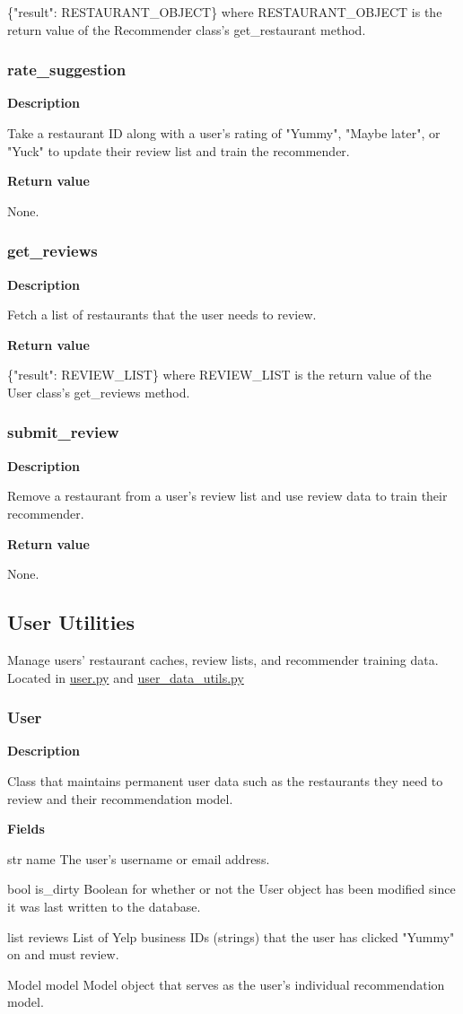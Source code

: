 \documentclass[11pt]{article}
\begin{document}
\{"result": RESTAURANT\_OBJECT\} where RESTAURANT\_OBJECT is the return value of the Recommender class's get\_restaurant method.

\subsubsection{rate\_suggestion}
\textbf{Description}

Take a restaurant ID along with a user's rating of "Yummy", "Maybe later", or "Yuck" to update their review list and train the recommender.

\textbf{Return value}

None.

\subsubsection{get\_reviews}
\textbf{Description}

Fetch a list of restaurants that the user needs to review.

\textbf{Return value}

\{"result": REVIEW\_LIST\} where REVIEW\_LIST is the return value of the User class's get\_reviews method.

\subsubsection{submit\_review}
\textbf{Description}

Remove a restaurant from a user's review list and use review data to train their recommender.

\textbf{Return value}

None.

\subsection{User Utilities}
Manage users' restaurant caches, review lists, and recommender training data. Located in \url{user.py} and \url{user\_data\_utils.py}

\subsubsection{User}
\textbf{Description}

Class that maintains permanent user data such as the restaurants they need to review and their recommendation model.

\textbf{Fields}
\begin{deflist}
	\item[str name] The user's username or email address.
	\item[bool is\_dirty] Boolean for whether or not the User object has been modified since it was last written to the database.
	\item[list reviews] List of Yelp business IDs (strings) that the user has clicked "Yummy" on and must review.
	\item[Model model] Model object that serves as the user's individual recommendation model.
\end{deflist}
\end{document}
